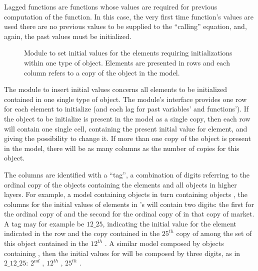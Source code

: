 \documentclass [11pt,a4paper] {book}
\begin{document}
Lagged functions are functions whose values are required for previous computation of the function. In this case, the very first time function's values are used there are no previous values to be supplied to the ``calling'' equation, and, again, the past values must be initialized.

\begin{figure}[ht]
  \centering
  \caption{\small Module to set initial values for the elements requiring initializations within one type of object. Elements are presented in rows and each column refers to a copy of the object in the model.}
  \label{fig:init1}
\end{figure}

The module to insert initial values concerns all elements to be initialized contained in one single type of object. The module's interface provides one row for each element to initialize (and each lag for past variables' and functions'). If the object to be initialize is present in the model as a single copy, then each row will contain one single cell, containing the present initial value for element, and giving the possibility to change it. If more than one copy of the object is present in the model, there will be as many columns as the number of copies for this object.

The columns are identified with a ``tag'', a combination of digits referring to the ordinal copy of the objects containing the elements and all objects in higher layers. For example, a model containing objects  in turn containing objects , the columns for the initial values of elements in 's will contain two digits: the first for the ordinal copy of  and the second for the ordinal copy of  in that copy of market. A tag may for example be $12\_25$, indicating the initial value for the element indicated in the row and the copy contained in the $25^{th}$ copy of  among the set of this object contained in the $12^{th}$ . A similar model composed by objects  containing , then the initial values for  will be composed by three digits, as in $2\_12\_25$: $2^{nd}$ , $12^{th}$ , $25^{th}$ .
\end{document}
